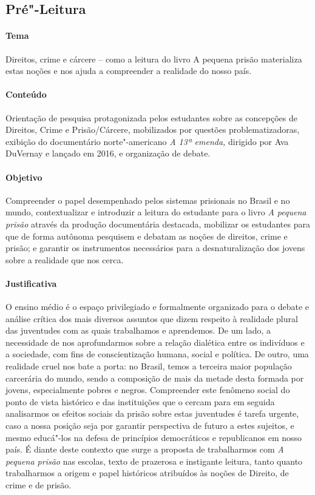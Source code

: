 \documentclass[11pt]{extarticle}
\begin{document}
\subsection{Pré"-Leitura}

\paragraph{Tema} Direitos, crime e cárcere -- como a leitura do livro A
pequena prisão materializa estas noções e nos ajuda a compreender a
realidade do nosso país.

\paragraph{Conteúdo} Orientação de pesquisa protagonizada pelos estudantes
sobre as concepções de Direitos, Crime e Prisão/Cárcere, mobilizados por
questões problematizadoras, exibição do documentário norte"-americano
\emph{A 13ª emenda,} dirigido por Ava DuVernay e lançado em 2016, e
organização de debate.

\paragraph{Objetivo} Compreender o papel desempenhado pelos sistemas
prisionais no Brasil e no mundo, contextualizar e introduzir a leitura do
estudante para o livro \emph{A pequena prisão} através da produção
documentária destacada, mobilizar os estudantes para que de forma
autônoma pesquisem e debatam as noções de direitos, crime e prisão; e
garantir os instrumentos necessários para a desnaturalização dos jovens
sobre a realidade que nos cerca.

\paragraph{Justificativa} O ensino médio é o espaço privilegiado e
formalmente organizado para o debate e análise crítica dos mais diversos
assuntos que dizem respeito à realidade plural das juventudes com as
quais trabalhamos e aprendemos. De um lado, a necessidade de nos
aprofundarmos sobre a relação dialética entre os indivíduos e a
sociedade, com fins de conscientização humana, social e política. De
outro, uma realidade cruel nos bate a porta: no Brasil, temos a terceira
maior população carcerária do mundo, sendo a composição de mais da
metade desta formada por jovens, especialmente pobres e negros.
Compreender este fenômeno social do ponto de vista histórico e das
instituições que o cercam para em seguida analisarmos os efeitos sociais
da prisão sobre estas juventudes é tarefa urgente, caso a nossa posição
seja por garantir perspectiva de futuro a estes sujeitos, e mesmo
educá"-los na defesa de princípios democráticos e republicanos em nosso
país. É diante deste contexto que surge a proposta de trabalharmos com
\emph{A pequena prisão} nas escolas, texto de prazerosa e instigante
leitura, tanto quanto trabalharmos a origem e papel históricos
atribuídos às noções de Direito, de crime e de prisão.
\end{document}
